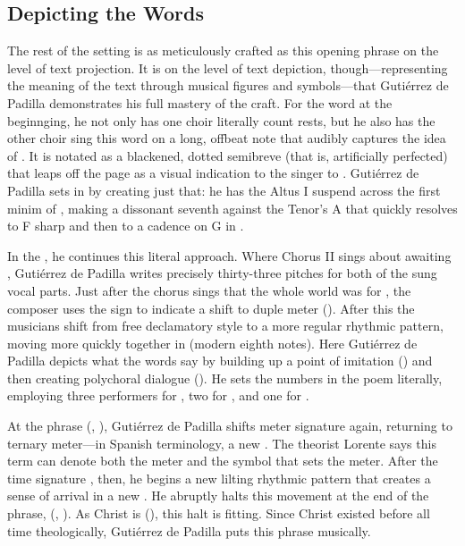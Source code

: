 \subsection{Depicting the Words}

The rest of the setting is as meticulously crafted as this opening phrase on the
level of text projection.
It is on the level of text depiction, though---representing the meaning of the
text through musical figures and symbols---that Gutiérrez de Padilla
demonstrates his full mastery of the craft.
For the word  at the beginnging, he not only has one choir
literally count rests, but he also has the other choir sing this word on a
long, offbeat note that audibly captures the idea of .
It is notated as a blackened, dotted semibreve (that is, artificially perfected)
that leaps off the page as a visual indication to the singer to .
Gutiérrez de Padilla sets  in 
by creating just that: he has the Altus I suspend across the first minim of
, making a dissonant seventh against the Tenor's A that quickly
resolves to F sharp and then to a cadence on G in .

In the , he continues this literal approach.
Where Chorus II sings about awaiting , Gutiérrez de
Padilla writes precisely thirty-three pitches for both of the sung vocal parts.
Just after the chorus sings that the whole world was  for
, the composer uses the \meterC{} sign to indicate a shift to
duple meter ().
After this the musicians shift from free declamatory style to a more regular
rhythmic pattern, moving more quickly together in  (modern
eighth notes).%
    \Autocite
    [This is the term used by Cerone and villancico poets (see  in ):]
    [\XXX]
    {Cerone:Melopeo}
Here Gutiérrez de Padilla depicts what the words say by building up a point of
imitation  () and then
creating polychoral dialogue ().
He sets the numbers in the poem literally, employing three performers for
, two for , and one for .

At the phrase  (, ), Gutiérrez de Padilla shifts meter signature
again, returning to ternary meter---in Spanish terminology, a new .
The theorist Lorente says this term can denote both the meter and the symbol
that sets the meter.%
    \Autocite[, 149]{Lorente:Porque}
After the time signature \meterCZ, then, he begins a new lilting rhythmic
pattern that creates a sense of arrival in a new .
He abruptly halts this movement at the end of the phrase,  (, ).
As Christ is  (), this halt is
fitting.
Since Christ existed before all time theologically, Gutiérrez de Padilla puts
this phrase  musically.

